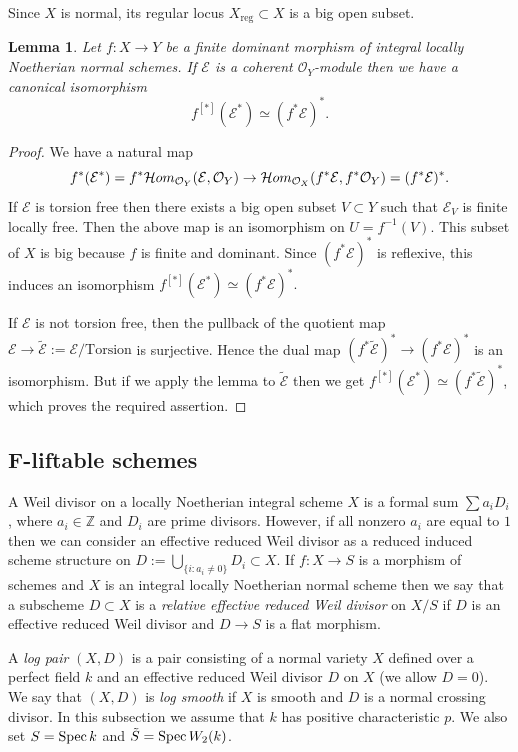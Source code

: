 \documentclass[12pt]{article}
\theoremstyle{plain}
\newtheorem{Lemma}[Thm]{\sc Lemma}
\theoremstyle{definition}
\theoremstyle{remark}
\newcommand{\ZZ}{{\mathbb Z}}
\newcommand{\cE}{{\mathcal E}}
\newcommand{\cO}{{\mathcal O}}
\newcommand{\cHom}{{\mathop{{\cal H}om}}}
\newcommand{\Spec}{{\mathop{{\rm Spec\, }}}}
\begin{document}
Since $X$ is normal, its regular locus $X_{\mathrm {reg}}\subset X$ is a big open subset.  


\medskip

\begin{Lemma}\label{pull-back-of-dual}
Let $f: X\to Y$ be a finite dominant  morphism of integral locally Noetherian normal schemes. 
If $\cE$ is a coherent $\cO_Y$-module then we have a canonical isomorphism
	$$f^{[*]}(\cE ^*)\simeq (f^*\cE)^*.$$
\end{Lemma}

\begin{proof}	
We have a natural map 
$$f^*(\cE^*)=f^*\cHom_{\cO_Y} (\cE, \cO_Y)\to
	 \cHom_{\cO_X} (f^*\cE , f^*\cO _Y)= (f^*\cE)^*.$$
If $\cE$ is  torsion free then there exists a big open subset $V\subset Y$ such that $\cE _V$ is finite locally free.
Then the above map is an isomorphism on $U=f^{-1}(V)$.  This subset of $X$ is big because $f$ is finite and dominant. Since $(f^*\cE)^*$ is reflexive, this induces an isomorphism $f^{[*]}(\cE ^*)\simeq (f^*\cE)^*.$

If $\cE$ is not torsion free, then the pullback of the quotient map $\cE\to \tilde \cE:=\cE/  {\mathrm{Torsion}}$ is  surjective.
Hence  the dual map $( f^*\tilde \cE)^* \to (f^*\cE)^* $ is an isomorphism. But if we apply the lemma to $\tilde \cE $
 then we get  $f^{[*]}(\cE ^*)\simeq (f^*\tilde \cE )^*$, which proves the required assertion.
\end{proof}

\subsection{F-liftable schemes}\label{F-liftability}

A Weil divisor on a locally Noetherian integral scheme $X$ is a formal sum $\sum a_i D_i$,
where $a_i\in \ZZ$ and $D_i$ are prime divisors. However, if all nonzero $a_i$ are equal to $1$ then we can consider an effective reduced Weil divisor as a reduced induced scheme structure on  $D:=\bigcup_{\{ i: a_i\ne 0\}}  D_i\subset X$. If $f: X\to S$ is a morphism of schemes and $X$ is an integral locally Noetherian normal scheme then we say that a subscheme $D\subset X$ is a \emph{relative effective reduced  Weil divisor} on $X/S$ if $D$ is an effective reduced Weil divisor and $D\to S$ is a flat morphism.

\medskip

A \emph{log pair} $(X,D)$ is a pair consisting of a normal variety $X$ defined over a perfect field $k$ and an effective reduced Weil divisor $D$ on $X$ (we allow $D=0$). We say that $(X, D)$ is \emph{log smooth} if $X$ is smooth and $D$ is a normal crossing divisor. In this subsection we assume that $k$ has positive characteristic $p$. We also set $S=\Spec k$ and $\tilde S=\Spec W_2(k)$.
\end{document}
